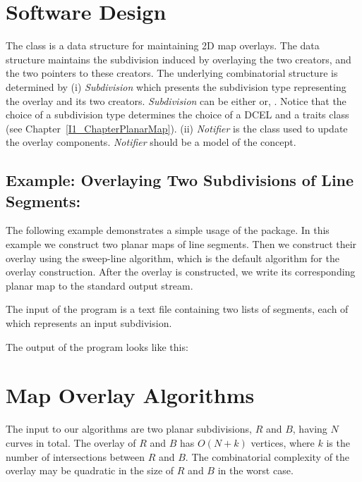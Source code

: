 \begin{ccTexOnly}

\section{Software Design}
The  class 
is a data structure for maintaining 2D map overlays.
The data structure maintains the subdivision induced by overlaying 
the two creators, and the two pointers to these creators. 
The underlying combinatorial structure is determined by
(i) {\it Subdivision} which presents the subdivision type 
representing the overlay and its two creators. 
{\it Subdivision} can be either  or, 
 .
Notice that the choice of a subdivision type determines the choice 
of a DCEL and a traits class (see Chapter~\ref{I1_ChapterPlanarMap}).
(ii) {\it Notifier} is the class used to update the overlay components. 
{\it Notifier} should be a model of the 
 concept.

\subsection*{Example: Overlaying Two Subdivisions of Line Segments:}
The following example demonstrates a simple usage of the 
 package.
In this example we construct two planar maps of line segments. 
Then we construct their overlay using the sweep-line algorithm, which is 
the default algorithm for the overlay construction. 
After the overlay is constructed, we write its corresponding planar map to the 
standard output stream. 

The input of the program is a text file containing two lists of segments, 
each of which represents an input subdivision.

The output of the program looks like this:

\section{Map Overlay Algorithms}
\label{sec:algorithms}
The input to our algorithms are two planar subdivisions, 
$R$ and $B$, having $N$ curves in total. 
The overlay of $R$ and $B$ has $O(N+k)$ vertices, 
where $k$ is the number of intersections between $R$ and $B$.
The combinatorial complexity of the overlay may be quadratic 
in the size of $R$ and $B$ in the worst case.


\end{ccTexOnly}
